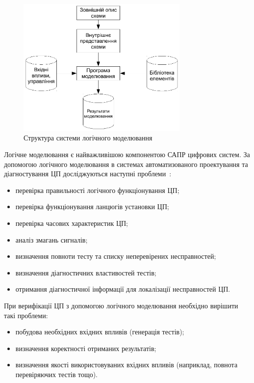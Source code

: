 \documentclass[12pt,a4paper]{article}
\begin{document}
\begin{figure}[h]
  \centering
    \includegraphics[width=0.75\textwidth]{logic-modelling-system-structure}
  \caption{Структура системи логічного моделювання\label{logicModStruct}}
\end{figure}

Логічне моделювання є найважливішою компонентою САПР цифрових систем. За допомогою логічного моделювання в системах автоматизованого проектування та діагностування ЦП досліджуються наступні проблеми~\cite{bib-logModNTest}:
\begin{itemize}
  \item перевірка правильності логічного функціонування ЦП;
  \item перевірка функціонування ланцюгів установки ЦП;
  \item перевірка часових характеристик ЦП;
  \item аналіз змагань сигналів;
  \item визначення повноти тесту та списку неперевірених несправностей;
  \item визначення діагностичних властивостей тестів;
  \item отримання діагностичної інформації для локалізації несправностей ЦП.
\end{itemize}

При верифікації ЦП з допомогою логічного моделювання необхідно вирішити такі проблеми:
\begin{itemize}
  \item побудова необхідних вхідних впливів (генерація тестів);
  \item визначення коректності отриманих результатів;
  \item визначення якості використовуваних вхідних впливів (наприклад, повнота перевіряючих тестів тощо).
\end{itemize}
\end{document}
